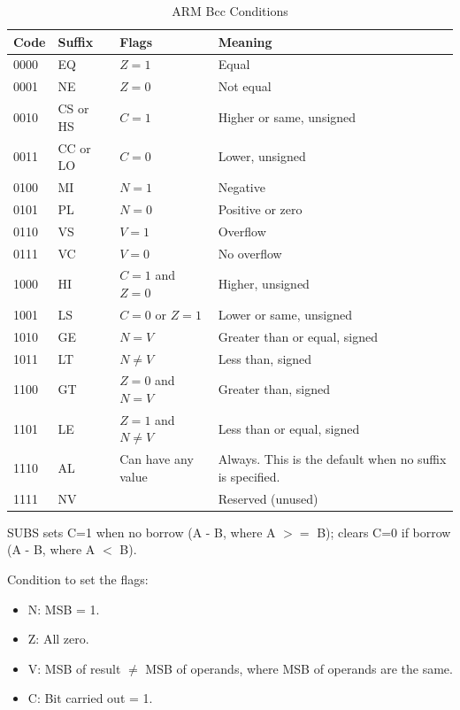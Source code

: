 \begin{table}[H]
\centering
\renewcommand{\arraystretch}{1.2}
\begin{tabular}{|l|l|l|l|}
\hline
\textbf{Code} & \textbf{Suffix} & \textbf{Flags} & \textbf{Meaning} \\ \hline
0000 & EQ & $Z = 1$ & Equal \\ \hline
0001 & NE & $Z = 0$ & Not equal \\ \hline
0010 & CS or HS & $C = 1$ & Higher or same, unsigned \\ \hline
0011 & CC or LO & $C = 0$ & Lower, unsigned \\ \hline
0100 & MI & $N = 1$ & Negative \\ \hline
0101 & PL & $N = 0$ & Positive or zero \\ \hline
0110 & VS & $V = 1$ & Overflow \\ \hline
0111 & VC & $V = 0$ & No overflow \\ \hline
1000 & HI & $C = 1$ and $Z = 0$ & Higher, unsigned \\ \hline
1001 & LS & $C = 0$ or $Z = 1$ & Lower or same, unsigned \\ \hline
1010 & GE & $N = V$ & Greater than or equal, signed \\ \hline
1011 & LT & $N \neq V$ & Less than, signed \\ \hline
1100 & GT & $Z = 0$ and $N = V$ & Greater than, signed \\ \hline
1101 & LE & $Z = 1$ and $N \neq V$ & Less than or equal, signed \\ \hline
1110 & AL & Can have any value & Always. This is the default when no suffix is specified. \\ \hline
1111 & NV & & Reserved (unused) \\ \hline
\end{tabular}
\caption*{ARM Bcc Conditions}
\end{table}

\noindent SUBS sets C=1 when no borrow (A - B, where A $>=$ B); clears C=0 if borrow (A - B, where A $<$ B).

\noindent Condition to set the flags:
\begin{itemize}
    \item N: MSB = 1.
    \item Z: All zero.
    \item V: MSB of result $\neq$ MSB of operands, where MSB of operands are the same.
    \item C: Bit carried out = 1.
\end{itemize}
